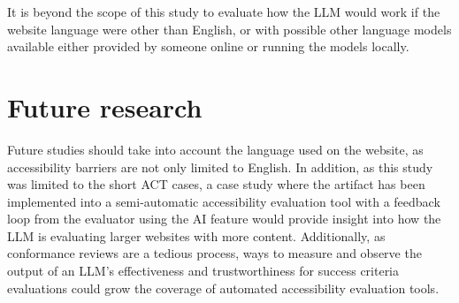 It is beyond the scope of this study to evaluate how the LLM would work if the website language were other than English, or with possible other language models available either provided by someone online or running the models locally.

\section{Future research}

Future studies should take into account the language used on the website, as accessibility barriers are not only limited to English. In addition, as this study was limited to the short ACT cases, a case study where the artifact has been implemented into a semi-automatic accessibility evaluation tool with a feedback loop from the evaluator using the AI feature would provide insight into how the LLM is evaluating larger websites with more content. Additionally, as conformance reviews are a tedious process, ways to measure and observe the output of an LLM's effectiveness and trustworthiness for success criteria evaluations could grow the coverage of automated accessibility evaluation tools.

